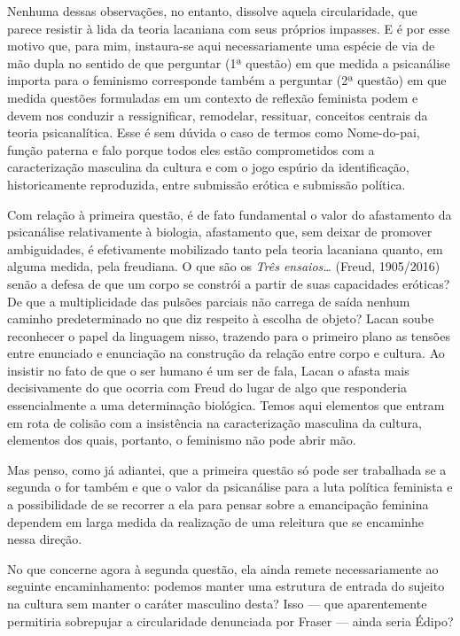 Nenhuma dessas observações, no entanto, dissolve aquela circularidade,
que parece resistir à lida da teoria lacaniana com seus próprios
impasses. E é por esse motivo que, para mim, instaura-se aqui
necessariamente uma espécie de via de mão dupla no sentido de que
perguntar (1ª questão) em que medida a psicanálise importa para o
feminismo corresponde também a perguntar (2ª questão) em que medida
questões formuladas em um contexto de reflexão feminista podem e devem
nos conduzir a ressignificar, remodelar, ressituar, conceitos centrais
da teoria psicanalítica. Esse é sem dúvida o caso de termos como
Nome-do-pai, função paterna e falo porque todos eles estão comprometidos
com a caracterização masculina da cultura e com o jogo espúrio da
identificação, historicamente reproduzida, entre submissão erótica e
submissão política.

Com relação à primeira questão, é de fato fundamental o valor do
afastamento da psicanálise relativamente à biologia, afastamento que,
sem deixar de promover ambiguidades, é efetivamente mobilizado tanto
pela teoria lacaniana quanto, em alguma medida, pela freudiana. O que
são os \emph{Três ensaios\ldots{}} (Freud, 1905/2016) senão a defesa de que
um corpo se constrói a partir de suas capacidades eróticas? De que a
multiplicidade das pulsões parciais não carrega de saída nenhum caminho
predeterminado no que diz respeito à escolha de objeto? Lacan soube
reconhecer o papel da linguagem nisso, trazendo para o primeiro plano as
tensões entre enunciado e enunciação na construção da relação entre
corpo e cultura. Ao insistir no fato de que o ser humano é um ser de
fala, Lacan o afasta mais decisivamente do que ocorria com Freud do
lugar de algo que responderia essencialmente a uma determinação
biológica. Temos aqui elementos que entram em rota de colisão com a
insistência na caracterização masculina da cultura, elementos dos quais,
portanto, o feminismo não pode abrir mão.

Mas penso, como já adiantei, que a primeira questão só pode ser
trabalhada se a segunda o for também e que o valor da psicanálise para a
luta política feminista e a possibilidade de se recorrer a ela para
pensar sobre a emancipação feminina dependem em larga medida da
realização de uma releitura que se encaminhe nessa direção.

No que concerne agora à segunda questão, ela ainda remete
necessariamente ao seguinte encaminhamento: podemos manter uma estrutura
de entrada do sujeito na cultura sem manter o caráter masculino desta?
Isso --- que aparentemente permitiria sobrepujar a circularidade
denunciada por Fraser --- ainda seria Édipo?

